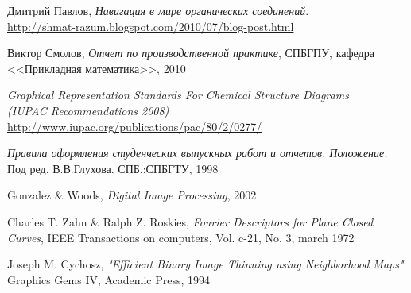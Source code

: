   \begin{thebibliography}{9}

  Дмитрий Павлов,
  \emph{Навигация в мире органических соединений}.\\
  \url{http://shmat-razum.blogspot.com/2010/07/blog-post.html}

  Виктор Смолов,
  \emph{Отчет по производственной практике}, СПБГПУ, кафедра <<Прикладная математика>>, 2010

  \emph{Graphical Representation Standards For Chemical Structure Diagrams \\ (IUPAC Recommendations 2008)} \\
  \url{http://www.iupac.org/publications/pac/80/2/0277/}

  \emph{Правила оформления студенческих выпускных работ и отчетов. Положение.} 
  Под ред. В.В.Глухова.
  СПБ.:СПБГТУ, 1998

  Gonzalez \& Woods,
  \emph{Digital Image Processing}, 2002

  Charles T. Zahn \& Ralph Z. Roskies,
  \emph{Fourier Descriptors for Plane Closed Curves},
   IEEE Transactions on computers, Vol. c-21, No. 3, march 1972

  Joseph M. Cychosz,
  \emph{"Efficient Binary Image Thinning using Neighborhood Maps"}
  Graphics Gems IV, Academic Press, 1994

\end{thebibliography}



